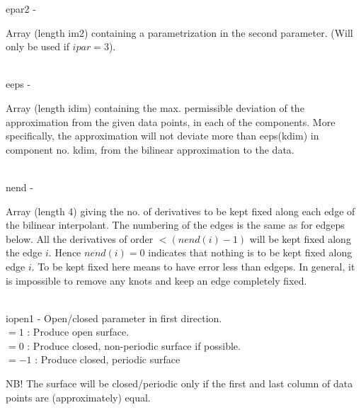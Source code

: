         \>\>    {\fov epar2}\> - \>  \begin{minipg2}
                     Array (length im2) containing a parametrization
                  in the second parameter. (Will only
                  be used if $ipar=3$).
                               \end{minipg2}\\[0.8ex]
        \>\>    {\fov eeps}\> - \>  \begin{minipg2}
                     Array (length idim) containing the max. permissible
                  deviation of the approximation from the given data
                  points, in each of the components. More specifically,
                  the approximation will not deviate more than eeps(kdim)
                  in component no. kdim, from the bilinear approximation
                  to the data.
                               \end{minipg2}\\[0.8ex]
        \>\>    {\fov nend}\> - \>  \begin{minipg2}
                     Array (length 4) giving the no. of derivatives to be
                  kept fixed along each edge of the bilinear interpolant.
                  The numbering of the edges is the same as for edgeps below.
                  All the derivatives of order $< (nend(i)-1)$ will be kept
                  fixed along the edge $i$. Hence $nend(i)=0$ indicates that
                  nothing is to be kept fixed along edge $i$.
                  To be kept fixed here means to have error less than edgeps.
                  In general, it is impossible to remove any knots and keep
                  an edge completely fixed.
                               \end{minipg2}\\[0.8ex]
        \>\>   {\fov iopen1}\> - \> Open/closed parameter in first direction.\\
          \>\>\>\>  $= 1$  : Produce open surface.\\
          \>\>\>\>  $= 0$ : Produce closed, non-periodic surface if possible.\\
          \>\>\>\>  $= -1$ : Produce closed, periodic surface\\
        \>\>\>\>  \begin{minipg2}
                  NB! The surface will be closed/periodic only if the first 
                      and last column of data points are (approximately) equal.
                               \end{minipg2}\\[0.8ex]
